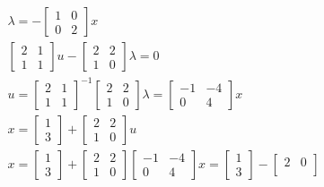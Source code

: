 \documentclass{article}
\begin{document}
  \begin{align*}
    &\lambda = - 
    \begin{bmatrix}
      1 & 0 \\
      0 & 2
    \end{bmatrix}x \\
    &\begin{bmatrix}
      2 & 1 \\
      1 & 1
    \end{bmatrix}u - 
    \begin{bmatrix}
      2 & 2 \\
      1 & 0
    \end{bmatrix} \lambda  = 0 \\
    &u = 
    \begin{bmatrix}
      2 & 1 \\
      1 & 1
    \end{bmatrix}^{-1} 
    \begin{bmatrix}
      2 & 2 \\
      1 & 0
    \end{bmatrix} \lambda = 
    \begin{bmatrix}
      -1 & -4 \\
      0  &  4 
    \end{bmatrix} x \\
    &x = 
    \begin{bmatrix}
      1 \\
      3
    \end{bmatrix} + 
    \begin{bmatrix}
      2 & 2 \\
      1 & 0
    \end{bmatrix}u \\
    &x = 
    \begin{bmatrix}
      1 \\
      3
    \end{bmatrix} + 
    \begin{bmatrix}
      2 & 2 \\
      1 & 0
    \end{bmatrix} 
    \begin{bmatrix}
      -1 & -4 \\
      0 &  4
    \end{bmatrix}x = 
    \begin{bmatrix}
      1 \\
      3
    \end{bmatrix} - 
    \begin{bmatrix}
      2 & 0 \\

\end{bmatrix}
\end{align*}
\end{document}
